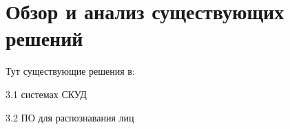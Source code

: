 \section{Обзор и анализ существующих решений}

Тут существующие решения в:

\begin{itemize*}
\item 3.1 системах СКУД
\item 3.2 ПО для распознавания лиц
\end{itemize*}
